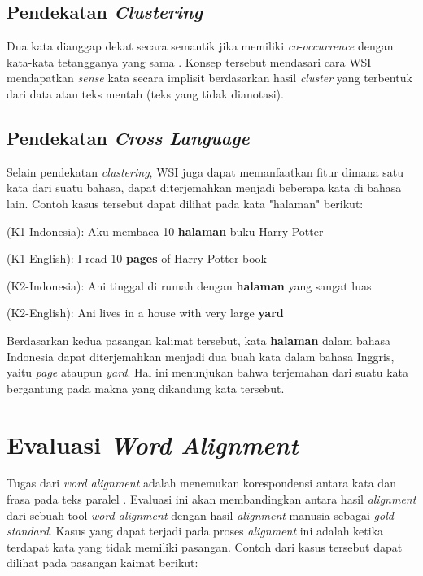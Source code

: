 	\subsection{Pendekatan \textit{Clustering}}
	Dua kata dianggap dekat secara semantik jika memiliki \textit{co-occurrence} dengan kata-kata tetangganya yang sama \citep{nasiruddin2013state}. Konsep tersebut mendasari cara WSI mendapatkan \textit{sense} kata secara implisit berdasarkan hasil \textit{cluster} yang terbentuk dari data atau teks mentah (teks yang tidak dianotasi). 
	
	\subsection{Pendekatan \textit{Cross Language}}
	Selain pendekatan \textit{clustering}, WSI juga dapat memanfaatkan fitur dimana satu kata dari suatu bahasa, dapat diterjemahkan menjadi beberapa kata di bahasa lain. Contoh kasus tersebut dapat dilihat pada kata "halaman" berikut:



	(K1-Indonesia): Aku membaca 10 \textbf{halaman} buku Harry Potter
	
	(K1-English): I read 10 \textbf{pages} of Harry Potter book
	
	(K2-Indonesia): Ani tinggal di rumah dengan \textbf{halaman} yang sangat luas
	
	(K2-English): Ani lives in a house with very large \textbf{yard}
	
	
	
	Berdasarkan kedua pasangan kalimat tersebut, kata \textbf{halaman} dalam bahasa Indonesia dapat diterjemahkan menjadi dua buah kata dalam bahasa Inggris, yaitu \textit{page} ataupun \textit{yard}. Hal ini menunjukan bahwa terjemahan dari suatu kata bergantung pada makna yang dikandung kata tersebut.

\section{Evaluasi \textit{Word Alignment}}
Tugas dari \textit{word alignment} adalah menemukan korespondensi antara kata dan frasa pada teks paralel 
\citep{mihalcea2003evaluation}. Evaluasi ini akan membandingkan antara hasil \textit{alignment} dari sebuah tool \textit{word alignment} dengan hasil \textit{alignment} manusia sebagai \textit{gold standard}. Kasus yang dapat terjadi pada proses \textit{alignment} ini adalah ketika terdapat kata yang tidak memiliki pasangan. Contoh dari kasus tersebut dapat dilihat pada pasangan kaimat berikut:


